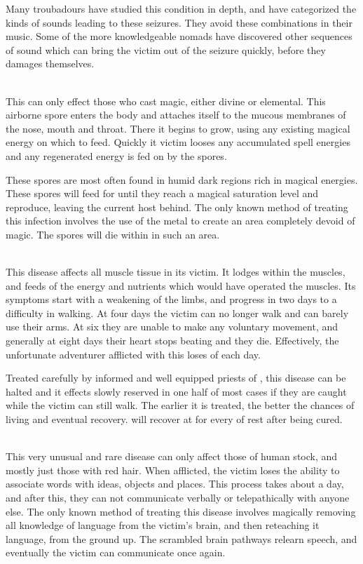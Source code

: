\begin{multicols}{2}
Many troubadours have studied this condition in depth, and have categorized the kinds of sounds leading to these seizures. They avoid these combinations in their music. Some of the more knowledgeable nomads have discovered other sequences of sound which can bring the victim out of the seizure quickly, before they damages themselves.

\\
This can only effect those who cast magic, either divine or elemental. This airborne spore enters the body and attaches itself to the mucous membranes of the nose, mouth and throat. There it begins to grow, using any existing magical energy on which to feed. Quickly it victim looses any accumulated spell energies and any regenerated energy is fed on by the spores.

These spores are most often found in humid dark regions rich in magical energies. These spores will feed for  until they reach a magical saturation level and reproduce, leaving the current host behind. The only known method of treating this infection involves the use of the metal  to create an area completely devoid of magic. The spores will die within  in such an area.

\\
This disease affects all muscle tissue in its victim. It lodges within the muscles, and feeds of the energy and nutrients which would have operated the muscles. Its symptoms start with a weakening of the limbs, and progress in two days to a difficulty in walking. At four days the victim can no longer walk and can barely use their arms. At six they are unable to make any voluntary movement, and generally at eight days their heart stops beating and they die. Effectively, the unfortunate adventurer afflicted with this loses  of \STR each day.

Treated carefully by informed and well equipped priests of , this disease can be halted and it effects slowly reserved in one half of most cases if they are caught while the victim can still walk. The earlier it is treated, the better the chances of living and eventual recovery. \STR will recover at  for every  of rest after being cured.

\\
This very unusual and rare disease can only affect those of human stock, and mostly just those with red hair. When afflicted, the victim loses the ability to associate words with ideas, objects and places. This process takes about a day, and after this, they can not communicate verbally or telepathically with anyone else. The only known method of treating this disease involves magically removing all knowledge of language from the victim's brain, and then reteaching it language, from the ground up. The scrambled brain pathways relearn speech, and eventually the victim can communicate once again.
\end{multicols}